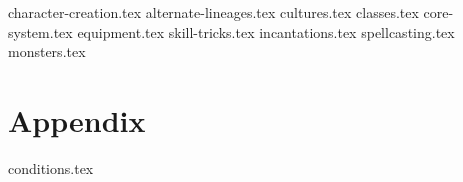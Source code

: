 \documentclass[10pt,twoside,twocolumn,openany]{dndbook}
\begin{document}
{character-creation.tex}
{alternate-lineages.tex}
{cultures.tex}
{classes.tex}
{core-system.tex}
{equipment.tex}
{skill-tricks.tex}
{incantations.tex}
{spellcasting.tex}
{monsters.tex}
\chapter{Appendix}\label{ch:appendix}
{conditions.tex}
\end{document}
